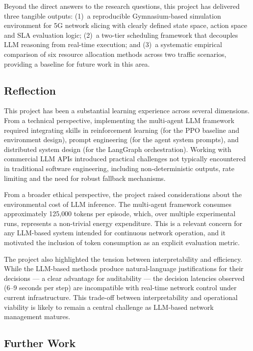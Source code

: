 Beyond the direct answers to the research questions, this project has delivered three tangible outputs: (1)~a reproducible Gymnasium-based simulation environment for 5G network slicing with clearly defined state space, action space and SLA evaluation logic; (2)~a two-tier scheduling framework that decouples LLM reasoning from real-time execution; and (3)~a systematic empirical comparison of six resource allocation methods across two traffic scenarios, providing a baseline for future work in this area.

\subsection{Reflection}

This project has been a substantial learning experience across several dimensions. From a technical perspective, implementing the multi-agent LLM framework required integrating skills in reinforcement learning (for the PPO baseline and environment design), prompt engineering (for the agent system prompts), and distributed system design (for the LangGraph orchestration). Working with commercial LLM APIs introduced practical challenges not typically encountered in traditional software engineering, including non-deterministic outputs, rate limiting and the need for robust fallback mechanisms.

From a broader ethical perspective, the project raised considerations about the environmental cost of LLM inference. The multi-agent framework consumes approximately 125{,}000 tokens per episode, which, over multiple experimental runs, represents a non-trivial energy expenditure. This is a relevant concern for any LLM-based system intended for continuous network operation, and it motivated the inclusion of token consumption as an explicit evaluation metric.

The project also highlighted the tension between interpretability and efficiency. While the LLM-based methods produce natural-language justifications for their decisions --- a clear advantage for auditability --- the decision latencies observed (6--9 seconds per step) are incompatible with real-time network control under current infrastructure. This trade-off between interpretability and operational viability is likely to remain a central challenge as LLM-based network management matures.

\subsection{Further Work}


